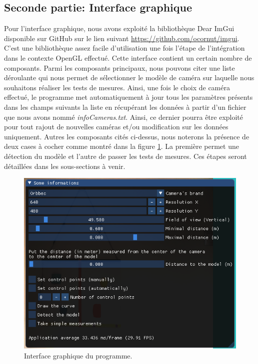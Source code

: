\documentclass[a4paper, 12pt]{book}
\newcounter{program}[subsection]
\begin{document}
\subsection{Seconde partie: Interface graphique}
Pour l'interface graphique, nous avons exploité la bibliothèque Dear ImGui disponible sur GitHub sur le lien suivant \url{https://github.com/ocornut/imgui}. C'est une bibliothèque assez facile d'utilisation une fois l'étape de l'intégration dans le contexte OpenGL effectué. Cette interface contient un certain nombre de composants. Parmi les composants principaux, nous pouvons citer une liste déroulante qui nous permet de sélectionner le modèle de caméra sur laquelle nous souhaitons réaliser les tests de mesures. Ainsi, une fois le choix de caméra effectué, le programme met automatiquement à jour tous les paramètres présents dans les champs suivants la liste en récupérant les données à partir d'un fichier que nous avons nommé \emph{infoCameras.txt}. Ainsi, ce dernier pourra être exploité pour tout rajout de nouvelles caméras et/ou modification sur les données uniquement.
Autres les composants cités ci-dessus, nous noterons la présence de deux cases à cocher comme montré dans la figure \ref{fig-gui}. La première permet une détection du modèle et l'autre de passer les tests de mesures. Ces étapes seront détaillées dans les sous-sections à venir. 

\begin{center}
	\begin{figure}[H]
	  \hspace{3cm}
	 \includegraphics[scale=0.385]{images/GUI.png}
	  \caption{Interface graphique du programme.\label{fig-gui}}
	\end{figure}
\end{center}
\end{document}
